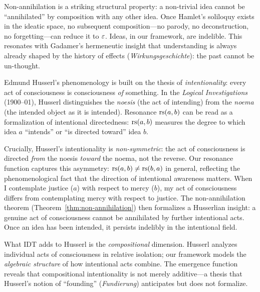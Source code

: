 \begin{interpretation}
Non-annihilation is a striking structural property: a non-trivial idea
cannot be ``annihilated'' by composition with any other idea. Once Hamlet's
soliloquy exists in the ideatic space, no subsequent composition---no
parody, no deconstruction, no forgetting---can reduce it to $\varepsilon$.
Ideas, in our framework, are indelible. This resonates with Gadamer's
hermeneutic insight that understanding is always already shaped by the
history of effects (\emph{Wirkungsgeschichte}): the past cannot be
un-thought.
\end{interpretation}

\begin{interpretation}\label{interp:ch1:husserl_intentionality}
Edmund Husserl's phenomenology is built on the thesis of \emph{intentionality}:
every act of consciousness is consciousness \emph{of} something. In the
\emph{Logical Investigations} (1900--01), Husserl distinguishes the
\emph{noesis} (the act of intending) from the \emph{noema} (the intended
object as it is intended). Resonance $\mathrm{rs}(a, b)$ can be read as a
formalization of intentional directedness: $\mathrm{rs}(a, b)$ measures the degree
to which idea $a$ ``intends'' or ``is directed toward'' idea $b$.

Crucially, Husserl's intentionality is \emph{non-symmetric}: the act of
consciousness is directed \emph{from} the noesis \emph{toward} the noema,
not the reverse. Our resonance function captures this asymmetry: $\mathrm{rs}(a,b)
\neq \mathrm{rs}(b,a)$ in general, reflecting the phenomenological fact that the
direction of intentional awareness matters. When I contemplate justice
($a$) with respect to mercy ($b$), my act of consciousness differs from
contemplating mercy with respect to justice. The non-annihilation theorem
(Theorem~\ref{thm:non-annihilation}) then formalizes a Husserlian insight:
a genuine act of consciousness cannot be annihilated by further intentional
acts. Once an idea has been intended, it persists indelibly in the
intentional field.

What IDT adds to Husserl is the \emph{compositional} dimension. Husserl
analyzes individual acts of consciousness in relative isolation; our
framework models the \emph{algebraic structure} of how intentional acts
combine. The emergence function reveals that compositional intentionality
is not merely additive---a thesis that Husserl's notion of ``founding''
(\emph{Fundierung}) anticipates but does not formalize.
\end{interpretation}

